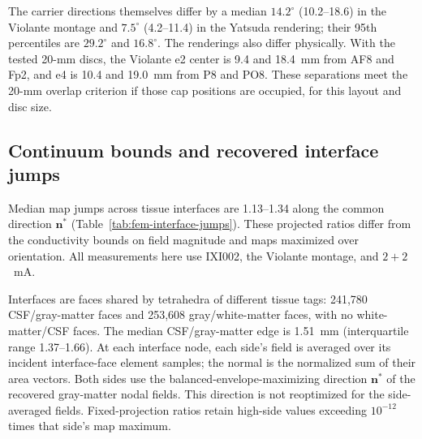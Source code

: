 \documentclass[11pt,a4paper]{article}
\providecommand{\DIFaddtex}[1]{{\protect\color{blue} \sf #1}} %
\providecommand{\DIFadd}[1]{\texorpdfstring{\DIFaddtex{#1}}{#1}} %
\begin{document}
\DIFadd{The carrier directions themselves differ by a median $14.2^\circ$
(10.2--18.6) in the Violante montage and $7.5^\circ$ (4.2--11.4) in the
Yatsuda rendering; their 95th percentiles are $29.2^\circ$ and $16.8^\circ$.
The renderings also differ physically. With the tested 20-mm discs, the
Violante e2 center is 9.4 and 18.4~mm from AF8 and Fp2, and e4 is 10.4 and
19.0~mm from P8 and PO8. These separations meet the 20-mm overlap criterion
if those cap positions are occupied, for this layout and disc size.
}

\subsection{\DIFadd{Continuum bounds and recovered interface jumps}}\label{supp:fem-interfaces}
\DIFadd{Median map jumps across tissue interfaces are 1.13--1.34 along the common
direction $\mathbf n^*$ (Table~\ref{tab:fem-interface-jumps}). These
projected ratios differ from the conductivity bounds on field magnitude
and maps maximized over orientation. All measurements here use IXI002,
the Violante montage, and $2+2$~mA.
}

\DIFadd{Interfaces are faces shared by tetrahedra of different tissue tags:
241,780 CSF/gray-matter faces and 253,608 gray/white-matter faces, with no
white-matter/CSF faces. The median CSF/gray-matter edge is 1.51~mm
(interquartile range 1.37--1.66). At each interface node, each side's field
is averaged over its incident interface-face element samples; the normal
is the normalized sum of their area vectors. Both sides use the
balanced-envelope-maximizing direction $\mathbf n^*$ of the recovered
gray-matter nodal fields. This direction is not reoptimized for the
side-averaged fields. Fixed-projection ratios retain high-side values
exceeding $10^{-12}$ times that side's map maximum.
}
\end{document}

